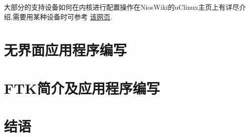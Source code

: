 \documentclass[12pt,a4paper,titlepage]{article}
\begin{document}
大部分的支持设备如何在内核进行配置操作在NiosWiki的uClinux主页上有详尽介绍,需要用某种设备时可参考
\href{http://www.nioswiki.com/OperatingSystems/UClinux}{该网页}.
\newpage{}
\section{无界面应用程序编写}
\newpage{}
\section{FTK简介及应用程序编写}
\newpage{}
\section{结语}
\end{document}
